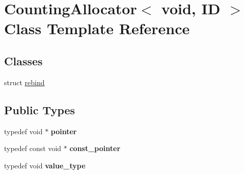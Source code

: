 \hypertarget{class_counting_allocator_3_01void_00_01_i_d_01_4}{}\section{Counting\+Allocator$<$ void, ID $>$ Class Template Reference}
\label{class_counting_allocator_3_01void_00_01_i_d_01_4}
\subsection*{Classes}
\begin{DoxyCompactItemize}
\item 
struct \mbox{\hyperlink{struct_counting_allocator_3_01void_00_01_i_d_01_4_1_1rebind}{rebind}}
\end{DoxyCompactItemize}
\subsection*{Public Types}
\begin{DoxyCompactItemize}
\item 
\mbox{\label{class_counting_allocator_3_01void_00_01_i_d_01_4_a9829bc681fc5bdab0c73a1c2de3eb4a4}} 
typedef void $\ast$ {\bfseries pointer}
\item 
\mbox{\label{class_counting_allocator_3_01void_00_01_i_d_01_4_adf1befba309ddf5fa41cf60f2b577344}} 
typedef const void $\ast$ {\bfseries const\+\_\+pointer}
\item 
\mbox{\label{class_counting_allocator_3_01void_00_01_i_d_01_4_a3829389c206c1489a40af3054e539799}} 
typedef void {\bfseries value\+\_\+type}
\end{DoxyCompactItemize}

